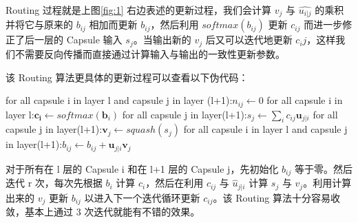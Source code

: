 Routing 过程就是上图\ref{fig:1} 右边表述的更新过程，我们会计算 $v_j$ 与 $\hat{u_{i|j}}$ 的乘积并将它与原来的 $b_{ij}$ 相加而更新 $b_{ij}$，然后利用 $softmax(b_{ij})$ 更新 $c_{ij}$ 而进一步修正了后一层的 Capsule 输入 $s_j$。当输出新的 $v_j$ 后又可以迭代地更新 $c_ij$，这样我们不需要反向传播而直接通过计算输入与输出的一致性更新参数。

该 Routing 算法更具体的更新过程可以查看以下伪代码：
%
\begin{algorithm}
	\begin{algorithmic}[1] 
		\State for all capsule i in layer l and capsule j in layer (l+1):$n_{ij}\leftarrow 0$
		\State for all capsule i in layer l:$\mathbf{c_i}\leftarrow softmax(\mathbf{b}_i)$
		\State 	for all capsule j in layer(l+1):$s_j\leftarrow \sum_ic_{ij}\mathbf{u}_{j|i}$
		\State  for all capsule j in layer(l+1):$\mathbf{v}_j\leftarrow squash(s_j)$
	        \State for all capsule i in layer l and capsule j in layer(l+1):$b_{ij}\leftarrow b_{ij}+\mathbf{u}_{j|i}\mathbf{v}_j$
	\EndFor
	\EndProcedure
	\end{algorithmic} 
\end{algorithm}
对于所有在 l 层的 Capsule i 和在 l+1 层的 Capsule j，先初始化 $b_{ij}$ 等于零。然后迭代 r 次，每次先根据 $b_i$ 计算 $c_i$，然后在利用 $c_{ij}$ 与 $\hat{u}_{j|i}$ 计算 $s_j$ 与 $v_j$。利用计算出来的 $v_j$ 更新 $b_{ij}$ 以进入下一个迭代循环更新 $c_{ij}$。该 Routing 算法十分容易收敛，基本上通过 3 次迭代就能有不错的效果。
